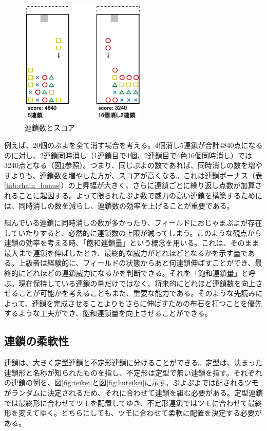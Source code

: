\documentclass[12pt]{jreport}
\begin{document}
\begin{figure}[tb]
  \begin{center}
  \includegraphics[height=6cm]{img/chain_score.png}
  \caption{連鎖数とスコア} \label{fig:chain_score}
\end{center}
\end{figure}

例えば、20個のぷよを全て消す場合を考える。4個消し5連鎖が合計4840点になるのに対し、2連鎖同時消し（1連鎖目で4個、2連鎖目で4色16個同時消し）では3240点となる（図\ref{fig:chain_score}参照）。つまり、同じぷよの数であれば、同時消しの数を増やすよりも、連鎖数を増やした方が、スコアが高くなる。これは連鎖ボーナス（表\ref{tab:chain_bonus}）の上昇幅が大きく、さらに連鎖ごとに繰り返し点数が加算されることに起因する。よって限られたぷよ数で威力の高い連鎖を構築するためには、同時消しの数を減らし、連鎖数の効率を上げることが重要である。

組んでいる連鎖に同時消しの数が多かったり、フィールドにおじゃまぷよが存在していたりすると、必然的に連鎖数の上限が減ってしまう。このような観点から連鎖の効率を考える時、「飽和連鎖量」という概念を用いる。これは、そのまま最大まで連鎖を伸ばしたとき、最終的な威力がどれほどとなるかを示す量である。上級者は経験的に、フィールドの状態からあと何連鎖伸ばすことができ、最終的にどれほどの連鎖威力になるかを判断できる。それを「飽和連鎖量」と呼ぶ。現在保持している連鎖の量だけではなく、将来的にどれほど連鎖数を向上させることが可能かを考えることもまた、重要な能力である。そのような先読みによって、連鎖を完成させることよりもさらに伸ばすための布石を打つことを優先するような工夫ができ、飽和連鎖量を向上させることができる。

\subsection{連鎖の柔軟性}
連鎖は、大きく定型連鎖と不定形連鎖に分けることができる。定型は、決まった連鎖形と名称が知られたものを指し、不定形は定型で無い連鎖を指す。それぞれの連鎖の例を、図\ref{fig:teikei}と図\ref{fig:huteikei}に示す。ぷよぷよでは配されるツモがランダムに決定されるため、それに合わせて連鎖を組む必要がある。定型連鎖では最終形に合わせてツモを配置してゆき、不定形連鎖ではツモに合わせて最終形を変えてゆく。どちらにしても、ツモに合わせて柔軟に配置を決定する必要がある。
\end{document}
